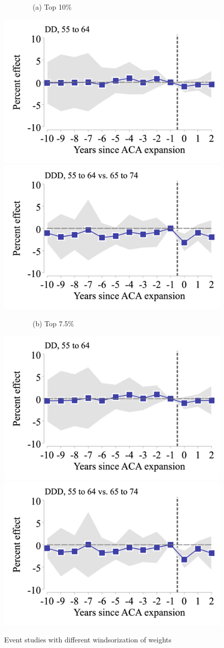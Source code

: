 \documentclass[12pt]{article}%
\begin{document}
\begin{appendices}
 \begin{figure}
    \caption{Event studies with different windsorization of weights}
    \label{fig:results-with-various-trimming}
    \begin{minipage}{\linewidth}
      \begin{minipage}{.49\linewidth}
        \begin{flushleft}
        ~~~~~~~~(a) Top 10\% \\
        \end{flushleft}
        \centering
        \includegraphics[width=.48\linewidth]{../output/figures/event_study_55_64_ln_amenable_trim_900.png}
        \includegraphics[width=.48\linewidth]{../output/figures/event_study_ddd_ln_amenable_trim_900.png} \\
        \begin{flushleft}
        ~~~~~~~~(b) Top 7.5\% \\
        \end{flushleft}
        \centering
        \includegraphics[width=.49\linewidth]{../output/figures/event_study_55_64_ln_amenable_trim_925.png}
        \includegraphics[width=.49\linewidth]{../output/figures/event_study_ddd_ln_amenable_trim_925.png} \\

\end{minipage}
\end{minipage}
\end{figure}
\end{appendices}
\end{document}
